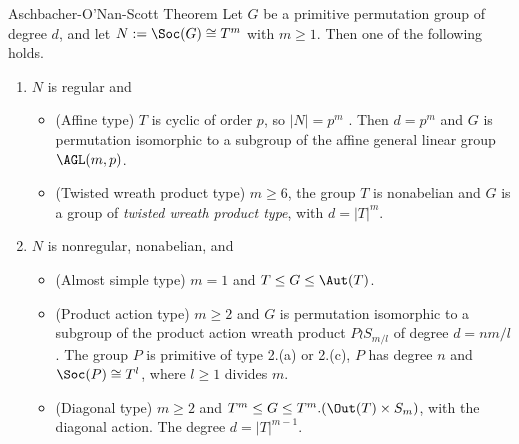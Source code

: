 


\begin{frame}[fragile,label=OSTheorem]{Aschbacher-O'Nan-Scott Theorem}
Let $G$ be a primitive permutation
group of degree $d$, and let $N := \Soc(G) \cong T^m$ with $m \geq 1$. 
Then one of the following holds.
\vskip2mm
\begin{enumerate}
\item 
$N$ is regular and
  \begin{itemize}
  \item 
  \alert{(Affine type)} $T$ is cyclic of order $p$, so $|N| = p^m$ . Then 
$d = p^m$ and $G$ is permutation isomorphic to a subgroup of the affine
general linear group $\AGL(m,p)$.
\vskip2mm
\item \alert{(Twisted wreath product type)} $m \geq 6$, the group $T$ is 
  nonabelian and $G$ is a group of \emph{twisted wreath product type}, with
  $d = |T|^m$.
  \end{itemize}
\vskip2mm
\item $N$ is nonregular, nonabelian, and
  \begin{itemize}
  \item 
\alert{(Almost simple type)} $m = 1$ and $T \leq G \leq \Aut(T)$.
\vskip2mm
\item \alert{(Product action type)} $m \geq 2$ and $G$ is permutation isomorphic to a
subgroup of the product action wreath product $P \wr S_{m/l}$ of degree
$d = nm/l$. The group $P$ is primitive of type 2.(a) or 2.(c), $P$ has
degree $n$ and $\Soc(P) \cong T^l$, where $l \geq 1$ divides $m$.
\vskip2mm
\item 
\alert{(Diagonal type)} $m \geq 2$ and $T^m \leq G \leq T^m . (\Out(T ) \times S_m)$, with
the diagonal action. The degree $d = |T|^{m-1}$.
  \end{itemize}
\end{enumerate}
\end{frame}






